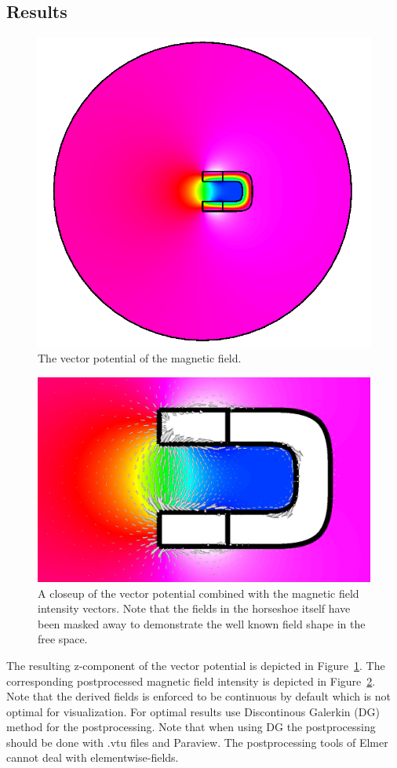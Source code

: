 \subsection*{Results}


\begin{figure}[h]
\centering
\includegraphics[width=120 mm]{HorseShoeA}
\caption{The vector potential of the magnetic field.}\label{fg:HorseShoeA}
\end{figure}  

\begin{figure}[h]
\centering
\includegraphics[width=120 mm]{HorseShoeB}
\caption{A closeup of the vector potential combined with the magnetic field intensity vectors. 
Note that the fields in the horseshoe itself have been
masked away to demonstrate the well known field shape in the free space.}\label{fg:HorseShoeB}
\end{figure}  


The resulting z-component of the vector potential is depicted in Figure~\ref{fg:HorseShoeA}.
The corresponding postprocessed magnetic field intensity is depicted in Figure~\ref{fg:HorseShoeB}. 
Note that the derived fields is enforced to be continuous by default which is not 
optimal for visualization. For optimal results use Discontinous Galerkin (DG) method
for the postprocessing. Note that when using DG the postprocessing should be done with .vtu files and 
Paraview. The postprocessing tools of Elmer cannot deal with elementwise-fields. 


\hfill



